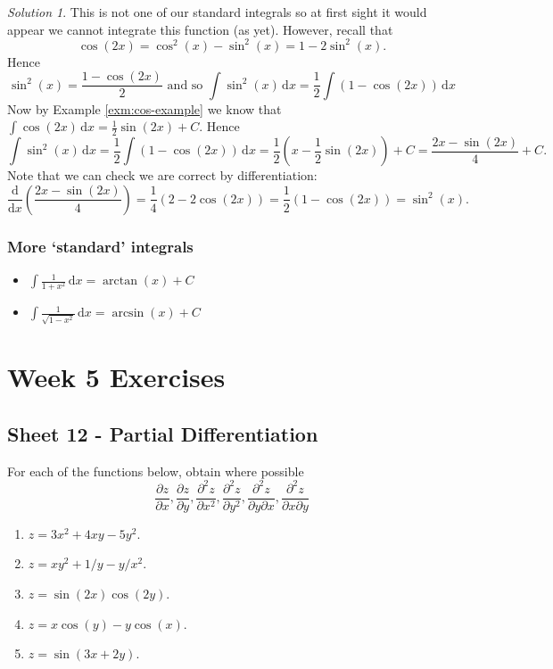 \documentclass[
  english,
  11pt,
  oneside]{book}
\providecommand{\tightlist}{%
  \setlength{\itemsep}{0pt}\setlength{\parskip}{0pt}}
\newcommand{\slide}{}
\theoremstyle{definition}
\theoremstyle{definition}
\theoremstyle{definition}
\theoremstyle{definition}
\theoremstyle{remark}
\newtheorem*{solution}{Solution}
\begin{document}
\begin{solution}
This is not one of our standard integrals so at first sight it would appear we cannot integrate this function (as yet). However, recall that
\[\cos(2x) = \cos^2(x)-\sin^2(x) = 1-2\sin^2(x).\]
Hence
\[\sin^2(x) = \frac{1-\cos(2x)}{2}\text{ and so }\int\sin^2(x)\,\mathrm{d}x = \frac12\int(1-\cos(2x))\,\mathrm{d}x\]
Now by Example \ref{exm:cos-example} we know that \(\displaystyle\int\cos(2x)\,\mathrm{d}x = \frac12\sin(2x)+C\).
Hence
\[\int\sin^2(x)\,\mathrm{d}x = \frac12\int(1-\cos(2x))\,\mathrm{d}x = \frac12\left(x-\frac12\sin(2x)\right)+C = \frac{2x-\sin(2x)}{4}+C.\]
Note that we can check we are correct by differentiation:
\[\frac{\mathrm{d}}{\mathrm{d}x}\left(\frac{2x-\sin(2x)}{4}\right)=\frac14\left(2-2\cos(2x)\right)=\frac12\left(1-\cos(2x)\right)=\sin^2(x).\]
\end{solution}

\slide

\subsection{More `standard' integrals}\label{more-standard-integrals}

\begin{itemize}
\tightlist
\item
  \(\int \frac{1}{1+x^2}\,\mathrm{d}x = \arctan(x) + C\)
\item
  \(\int \frac{1}{\sqrt{1-x^2}}\,\mathrm{d}x = \arcsin(x) + C\)
\end{itemize}

\chapter*{Week 5 Exercises}\label{week-5-exercises}

\section{Sheet 12 - Partial Differentiation}\label{sheet-12---partial-differentiation}

For each of the functions below, obtain where possible
\[\frac{\partial z}{\partial x}, \frac{\partial z}{\partial y}, \frac{\partial^2 z}{\partial x^2}, \frac{\partial^2 z}{\partial y^2}, \frac{\partial^2 z}{\partial y\partial x}, \frac{\partial^2 z}{\partial x\partial y}\]

\begin{enumerate}
\def\labelenumi{\arabic{enumi}.}
\tightlist
\item
  \(z=3x^2+4xy-5y^2\).
\item
  \(z=xy^2+1/y-y/x^2\).
\item
  \(z=\sin(2x)\cos(2y)\).
\item
  \(z=x\cos(y)-y\cos(x)\).
\item
  \(z=\sin(3x+2y)\).
\end{enumerate}
\end{document}
